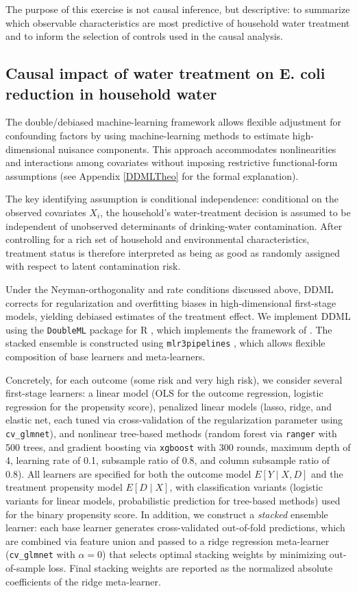 \documentclass [11pt]{article}
\theoremstyle{plain}
\theoremstyle{definition}
\theoremstyle{remark}
\newcommand{\1}{\bm{1}}
\begin{document}
The purpose of this exercise is not causal inference, but descriptive: to summarize which observable characteristics are most predictive of household water treatment and to inform the selection of controls used in the causal analysis. 

\subsection{Causal impact of water treatment on E. coli reduction in household water}

The double/debiased machine-learning framework allows flexible adjustment for confounding factors by using machine-learning methods to estimate high-dimensional nuisance components. This approach accommodates nonlinearities and interactions among covariates without imposing restrictive functional-form assumptions (see Appendix \ref{DDMLTheo} for the formal explanation).

The key identifying assumption is conditional independence: conditional on the observed covariates $X_i$, the household's water-treatment decision is assumed to be independent of unobserved determinants of drinking-water contamination. After controlling for a rich set of household and environmental characteristics, treatment status is therefore interpreted as being as good as randomly assigned with respect to latent contamination risk.

Under the Neyman-orthogonality and rate conditions discussed above, DDML corrects for regularization and overfitting biases in high-dimensional first-stage models, yielding debiased estimates of the treatment effect. We implement DDML using the \texttt{DoubleML} package for R \citep{doubleml2022}, which implements the framework of \citet{chernozhukov2018double}. The stacked ensemble is constructed using \texttt{mlr3pipelines} \citep{mlr3pipelines}, which allows flexible composition of base learners and meta-learners.

Concretely, for each outcome (some risk and very high risk), we consider several first-stage learners: a linear model (OLS for the outcome regression, logistic regression for the propensity score), penalized linear models (lasso, ridge, and elastic net, each tuned via cross-validation of the regularization parameter using \texttt{cv\_glmnet}), and nonlinear tree-based methods (random forest via \texttt{ranger} with 500 trees, and gradient boosting via \texttt{xgboost} with 300 rounds, maximum depth of 4, learning rate of 0.1, subsample ratio of 0.8, and column subsample ratio of 0.8). All learners are specified for both the outcome model $E[Y \mid X, D]$ and the treatment propensity model $E[D \mid X]$, with classification variants (logistic variants for linear models, probabilistic prediction for tree-based methods) used for the binary propensity score. In addition, we construct a \textit{stacked} ensemble learner: each base learner generates cross-validated out-of-fold predictions, which are combined via feature union and passed to a ridge regression meta-learner (\texttt{cv\_glmnet} with $\alpha = 0$) that selects optimal stacking weights by minimizing out-of-sample loss. Final stacking weights are reported as the normalized absolute coefficients of the ridge meta-learner.
\end{document}
